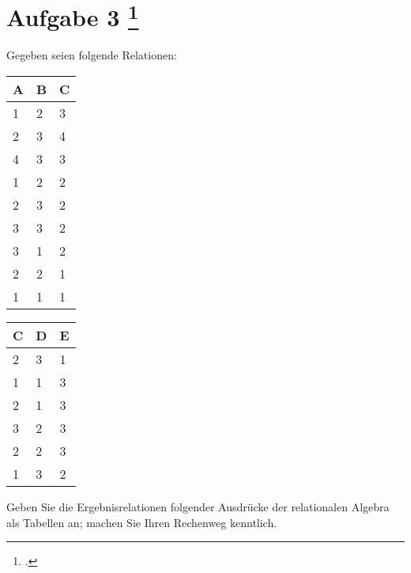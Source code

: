 \documentclass{lehramt-informatik-aufgabe}
\begin{document}
\liAufgabenTitel{}
\section{Aufgabe 3
\footcite{66116:2019:03}}

Gegeben seien folgende Relationen:


\begin{tabular}{|l|l|l|}
\hline
A & B & C \\ \hline
1 & 2 & 3 \\ \hline
2 & 3 & 4 \\ \hline
4 & 3 & 3 \\ \hline
1 & 2 & 2 \\ \hline
2 & 3 & 2 \\ \hline
3 & 3 & 2 \\ \hline
3 & 1 & 2 \\ \hline
2 & 2 & 1 \\ \hline
1 & 1 & 1 \\ \hline
\end{tabular}


\begin{tabular}{|l|l|l|}
\hline
C & D & E \\ \hline
2 & 3 & 1 \\ \hline
1 & 1 & 3 \\ \hline
2 & 1 & 3 \\ \hline
3 & 2 & 3 \\ \hline
2 & 2 & 3 \\ \hline
1 & 3 & 2 \\ \hline
\end{tabular}

Geben Sie die Ergebnisrelationen folgender Ausdrücke der relationalen
Algebra als Tabellen an; machen Sie Ihren Rechenweg kenntlich.



\end{document}
